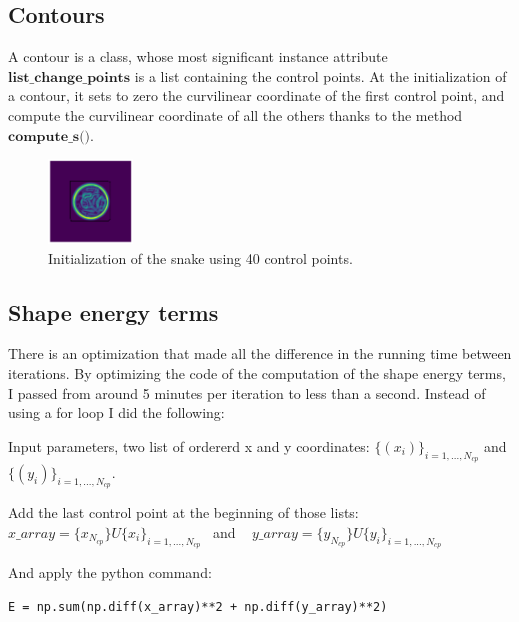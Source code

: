 \documentclass[24pt]{article}
\begin{document}
\subsection{Contours}

A contour is a class, whose most significant instance attribute  $\textbf{list\_change\_points}$  is a list containing the control points. 
At the initialization of a contour, it sets to zero the curvilinear coordinate of the first control point, and compute the curvilinear coordinate of all the others thanks to the method $\textbf{compute\_s()}$.

\begin{figure}[h!]
  \centering
  \includegraphics[width=0.2\textwidth]{control_point.png}
  \caption{Initialization of the snake using 40 control points.  }
  \label{fig:image_and_grad}
\end{figure}





\subsection{Shape energy terms}

 There is an optimization that made all the difference in the running time between iterations. By optimizing the code of the computation of the shape energy terms, I passed from around 5 minutes per iteration to less than a second. 
Instead of using a for loop I did the following:

Input parameters, two list of ordererd x and y coordinates:  $\{(x_i) \}_{i = 1,..., N_{cp}}$ and $\{(y_i) \}_{i = 1,..., N_{cp}}$. 


Add the last control point at the beginning of those lists:  $x\_array = \{x_{N_{cp}} \} U \{x_i \}_{i = 1,..., N_{cp}}$  ~and ~ $y\_array = \{y_{N_{cp}} \} U \{y_i \}_{i = 1,..., N_{cp}}$ 


And apply the python command: 

\begin{lstlisting}
E = np.sum(np.diff(x_array)**2 + np.diff(y_array)**2)
\end{lstlisting}
\end{document}
